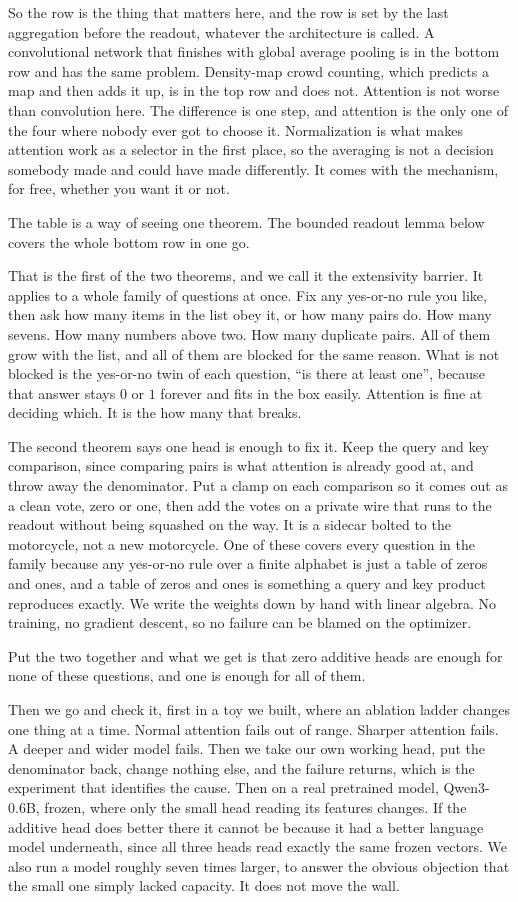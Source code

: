 \documentclass[10pt]{article}
\theoremstyle{definition}
\begin{document}
So the row is the thing that matters here, and the row is set by the last
aggregation before the readout, whatever the architecture is called. A
convolutional
network that finishes with global average pooling is in the bottom row and
has the same problem. Density-map crowd counting, which predicts a map and
then adds it up, is in the top row and does not. Attention is not worse
than convolution here. The difference is one step, and attention is the
only one of the four where nobody ever got to choose it. Normalization is what makes attention work
as a selector in the first place, so the averaging is not a decision
somebody made and could have made differently. It comes with the
mechanism, for free, whether you want it or not.

The table is a way of seeing one theorem. The bounded readout lemma below
covers the whole bottom row in one go.

That is the first of the two theorems, and we call it the extensivity
barrier. It applies to a whole family of questions at once. Fix any yes-or-no rule
you like, then ask how many items
in the list obey it, or how many pairs do. How many sevens. How many numbers above two. How many
duplicate pairs. All of them grow with the list, and all of them are
blocked for the same reason. What is not blocked is the yes-or-no twin of
each question, ``is there at least one'', because that answer stays $0$ or
$1$ forever and fits in the box easily. Attention is fine at deciding
which. It is the how many that breaks.

The second theorem says one head is enough to fix it. Keep the query and
key comparison, since comparing pairs is what attention is already good
at, and throw away the denominator. Put a clamp on each comparison so it
comes out as a clean vote, zero or one, then add the votes on a private
wire that runs to the readout without being squashed on the way. It is a
sidecar bolted to the motorcycle, not a new motorcycle. One of these
covers every question in the family because any yes-or-no rule over a
finite alphabet is just a table of zeros and ones, and a table of zeros
and ones is something a query and key product reproduces exactly. We write
the weights down by hand with linear algebra. No training, no gradient
descent, so no failure can be blamed on the optimizer.

Put the two together and what we get is that zero additive heads are enough
for none of these questions, and one is enough for all of them.

Then we go and check it, first in a toy we built, where an ablation ladder
changes one thing at a time. Normal attention fails out of range. Sharper
attention fails. A deeper and wider model fails. Then we take our own
working head, put the denominator back, change nothing else, and the
failure returns, which is the experiment that identifies the cause. Then on a real pretrained model, Qwen3-0.6B,
frozen, where only the small head reading its features changes. If the
additive head does better there it cannot be because it had a better
language model underneath, since all three heads read exactly the same
frozen vectors. We also run a model roughly seven times larger, to answer
the obvious objection that the small one simply lacked capacity. It does
not move the wall.
\end{document}
